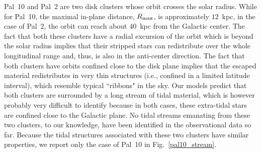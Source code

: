             Pal~10 and Pal~2 are two disk clusters whose orbit crosses the solar radius. While for Pal~10, the maximal in-plane distance, $R_{\rm max}$, is approximately $12$~kpc, in the case of Pal~2, the orbit can reach about 40~kpc from the Galactic center. The fact that both these clusters have a radial excursion of the orbit which is beyond the solar radius implies that their stripped stars can redistribute over the whole longitudinal range and, thus, is also in the anti-center direction. The fact that both clusters have orbits confined close to the disk plane implies that the escaped material redistributes in very thin structures (i.e., confined in a limited latitude interval), which resemble typical ``ribbons" in the sky.  Our models predict that both clusters are surrounded by a long stream of tidal material, which is however probably very difficult to identify because in both cases, these extra-tidal stars are confined close to the Galactic plane. No tidal streams emanating from these two clusters, to our knowledge, have been identified in the observational data so far.  Because the tidal structures associated with these two clusters have similar properties, we report only the case of Pal~10 in Fig.~\ref{pal10_stream}. 
            \twocolumn

